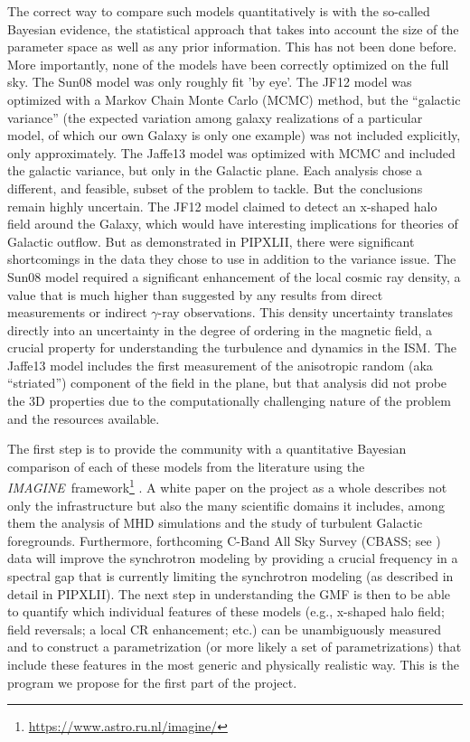 \documentclass[12pt]{article}
\newcommand{\imagineSW}{\textsl{IMAGINE}}
\begin{document}
The correct way to compare such models quantitatively is with the so-called Bayesian evidence, the statistical approach that takes into account the size of the parameter space as well as any prior information. This has not been done before. More importantly, none of the models have been correctly optimized on the full sky. The Sun08 model was only roughly fit 'by eye'. The JF12 model was optimized with a Markov Chain Monte Carlo (MCMC) method, but the ``galactic variance'' (the expected variation among galaxy realizations of a particular model, of which our own Galaxy is only one example) was not included explicitly, only approximately. The Jaffe13 model was optimized with MCMC and included the galactic variance, but only in the Galactic plane. Each analysis chose a different, and feasible, subset of the problem to tackle. But the conclusions remain highly uncertain. The JF12 model claimed to detect an x-shaped halo field around the Galaxy, which would have interesting implications for theories of Galactic outflow.  But as demonstrated in PIPXLII, there were significant shortcomings in the data they chose to use in addition to the variance issue. The Sun08 model required a significant enhancement of the local cosmic ray density, a value that is much higher than suggested by any results from direct measurements or indirect $\gamma$-ray observations. This density uncertainty translates directly into an uncertainty in the degree of ordering in the magnetic field, a crucial property for understanding the turbulence and dynamics in the ISM.  The Jaffe13 model includes the first measurement \citep{jaffe10} of the anisotropic random (aka ``striated'') component of the field in the plane, but that analysis did not probe the 3D properties due to the computationally challenging nature of the problem and the resources available. 

The first step is to provide the community with a quantitative Bayesian comparison of each of these models from the literature using the \imagineSW\ framework\footnote{\url{https://www.astro.ru.nl/imagine/}} \citep{imagineWP}.  A white paper on the project as a whole \citep{imagineWP} describes not only the infrastructure but also the many scientific domains it includes, among them the analysis of MHD simulations and the study of turbulent Galactic foregrounds.  Furthermore, forthcoming C-Band All Sky Survey (CBASS; see \citealt{cbass}) data will improve the synchrotron modeling by providing a crucial frequency in a spectral gap that  is currently limiting the synchrotron modeling  (as described in detail in PIPXLII).  The next step in understanding the GMF is then to be able to quantify which individual features of these models (e.g., x-shaped halo field; field reversals; a local CR enhancement; etc.) can be unambiguously measured and to construct a parametrization (or more likely a set of parametrizations) that include these features in the most generic and physically realistic way. This is the program we propose for the first part of the project. 
\end{document}
